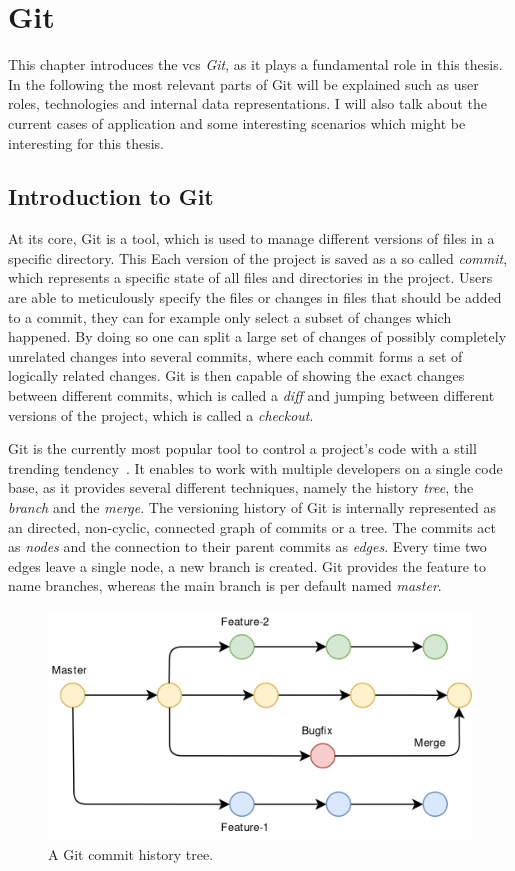 \section{Git}\label{git-explanation}
This chapter introduces the \ac{vcs} \emph{Git}, as it plays a fundamental role in this thesis.
In the following the most relevant parts of Git will be explained such as user roles, technologies and internal data representations.
I will also talk about the current cases of application and some interesting scenarios which might be interesting for this thesis.


\subsection{Introduction to Git}\label{git-introduction}
At its core, Git is a tool, which is used to manage different versions of files in a specific directory. This
Each version of the project is saved as a so called \emph{commit}, which represents a specific state of all files and directories in the project.
Users are able to meticulously specify the files or changes in files that should be added to a commit, they can for example only select a subset of changes which happened.
By doing so one can split a large set of changes of possibly completely unrelated changes into several commits, where each commit forms a set of logically related changes.
Git is then capable of showing the exact changes between different commits, which is called a \emph{diff} and jumping between different versions of the project, which is called a \emph{checkout}.

Git is the currently most popular tool to control a project's code with a still trending tendency~\cite{article:git-popularity}.
It enables to work with multiple developers on a single code base, as it provides several different techniques, namely the history \emph{tree}, the \emph{branch} and the \emph{merge}.
The versioning history of Git is internally represented as an directed, non-cyclic, connected graph of commits or a tree.
The commits act as \emph{nodes} and the connection to their parent commits as \emph{edges}.
Every time two edges leave a single node, a new branch is created.
Git provides the feature to name branches, whereas the main branch is per default named \emph{master}.

\begin{figure}[H]
    \includegraphics[scale=0.35]{./graphs/git-history-branch}
    \centering
    \caption{A Git commit history tree.}\label{fig:git-commit-tree}
\end{figure}

